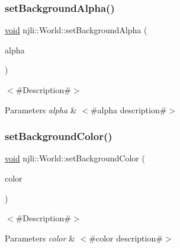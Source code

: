\mbox{\label{classnjli_1_1_world_a7eebf55a7920061d87e5dc03feb692da}} 
\subsubsection{\texorpdfstring{set\+Background\+Alpha()}{setBackgroundAlpha()}}
{\footnotesize\ttfamily \mbox{\hyperlink{_thread_8h_af1e856da2e658414cb2456cb6f7ebc66}{void}} njli\+::\+World\+::set\+Background\+Alpha (\begin{DoxyParamCaption}\item[{const \mbox{\hyperlink{_util_8h_a5f6906312a689f27d70e9d086649d3fd}{f32}}}]{alpha }\end{DoxyParamCaption})}

$<$\#\+Description\#$>$


\begin{DoxyParams}{Parameters}
{\em alpha} & $<$\#alpha description\#$>$ \\
\hline
\end{DoxyParams}
\mbox{\label{classnjli_1_1_world_a011db5e9383aa6628892cd431c3657a5}} 
\subsubsection{\texorpdfstring{set\+Background\+Color()}{setBackgroundColor()}\hspace{0.1cm}{\footnotesize\ttfamily [1/3]}}
{\footnotesize\ttfamily \mbox{\hyperlink{_thread_8h_af1e856da2e658414cb2456cb6f7ebc66}{void}} njli\+::\+World\+::set\+Background\+Color (\begin{DoxyParamCaption}\item[{const bt\+Vector3 \&}]{color }\end{DoxyParamCaption})}

$<$\#\+Description\#$>$


\begin{DoxyParams}{Parameters}
{\em color} & $<$\#color description\#$>$ \\
\hline
\end{DoxyParams}
\mbox{\label{classnjli_1_1_world_ab7bbd4dee42bec416fb2b64e9843ddf1}} 
